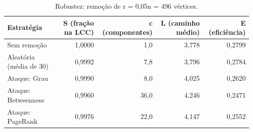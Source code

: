 \begin{table}[ht]
\centering
\caption{Robustez: remoção de r = 0,05n = 496 vértices.}
\label{tab:robustez}
\small
\begin{tabular}{lrrrr}
\hline
Estratégia & S (fração na LCC) & c (componentes) & L (caminho médio) & E (eficiência) \\
\hline
Sem remoção & 1,0000 & 1,0 & 3,778 & 0,2799 \\
Aleatória (média de 30) & 0,9992 & 7,8 & 3,796 & 0,2784 \\
Ataque: Grau & 0,9990 & 8,0 & 4,025 & 0,2620 \\
Ataque: Betweenness & 0,9960 & 36,0 & 4,246 & 0,2471 \\
Ataque: PageRank & 0,9976 & 22,0 & 4,147 & 0,2552 \\
\hline
\end{tabular}
\end{table}
